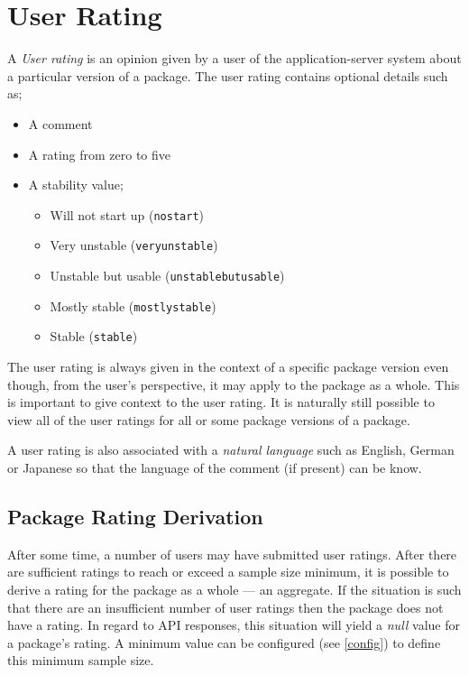 
\section{User Rating}
\label{userrating}

A {\it User rating} is an opinion given by a user of the application-server system about a particular version of a package.  The user rating contains optional details such as;

\begin{itemize}
\item A comment
\item A rating from zero to five
\item A stability value;
\begin{itemize}
\item Will not start up ({\tt nostart})
\item Very unstable ({\tt veryunstable})
\item Unstable but usable ({\tt unstablebutusable})
\item Mostly stable ({\tt mostlystable})
\item Stable ({\tt stable})
\end{itemize}
\end{itemize}

The user rating is always given in the context of a specific package version even though, from the user's perspective, it may apply to the package as a whole.  This is important to give context to the user rating.  It is naturally still possible to view all of the user ratings for all or some package versions of a package.

A user rating is also associated with a {\it natural language} such as English, German or Japanese so that the language of the comment (if present) can be know.

\subsection{Package Rating Derivation}

After some time, a number of users may have submitted user ratings.  After there are sufficient ratings to reach or exceed a sample size minimum, it is possible to derive a rating for the package as a whole --- an aggregate.  If the situation is such that there are an insufficient number of user ratings then the package does not have a rating.  In regard to API responses, this situation will yield a {\it null} value for a package's rating.  A minimum value can be configured (see \ref{config}) to define this minimum sample size.

